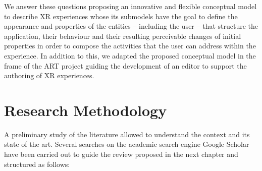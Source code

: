 We answer these questions proposing an innovative and flexible conceptual model to describe XR experiences whose its submodels have the goal to define the appearance and properties of the entities -- including the user -- that structure the application, their behaviour and their resulting perceivable changes of initial properties in order to compose the activities that the user can address within the experience. In addition to this, we adapted the proposed conceptual model in the frame of the ART project guiding the development of an editor to support the authoring of XR experiences.

\section{Research Methodology}
A preliminary study of the literature allowed to understand the context and its state of the art. Several searches on the academic search engine Google Scholar have been carried out to guide the review proposed in the next chapter and structured as follows:
